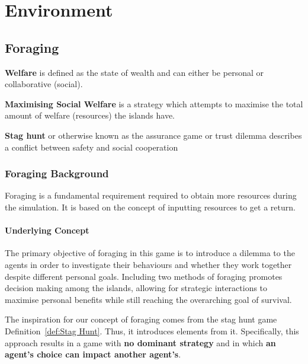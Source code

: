 \chapter{Environment}
\section{Foraging}
\label{sec:enviroment:foraging}

\begin{definition} \label{def:Welfare}
\textbf{Welfare} is defined as the state of wealth and can either be personal or collaborative (social).
\end{definition}

\begin{definition} \label{def:Maximising Social Welfare}
\textbf{Maximising Social Welfare} is a strategy which attempts to maximise the total amount of welfare (resources) the islands have.
\end{definition}

\begin{definition} \label{def:Stag Hunt}
\textbf{Stag hunt} or otherwise known as the assurance game or trust dilemma describes a conflict between safety and social cooperation
\end{definition}


\subsection{Foraging Background}

Foraging is a fundamental requirement required to obtain more resources during the simulation. It is based on the concept of inputting resources to get a return.

\subsubsection{Underlying Concept}

The primary objective of foraging in this game is to introduce a dilemma to the agents in order to investigate their behaviours and whether they work together despite different personal goals. Including two methods of foraging promotes decision making among the islands, allowing for strategic interactions to maximise personal benefits while still reaching the overarching goal of survival. 

The inspiration for our concept of foraging comes from the stag hunt game Definition~\ref{def:Stag Hunt}. Thus, it introduces elements from it. Specifically, this approach results in a game with \textbf{no dominant strategy} and in which \textbf{an agent's choice can impact another agent's}.

